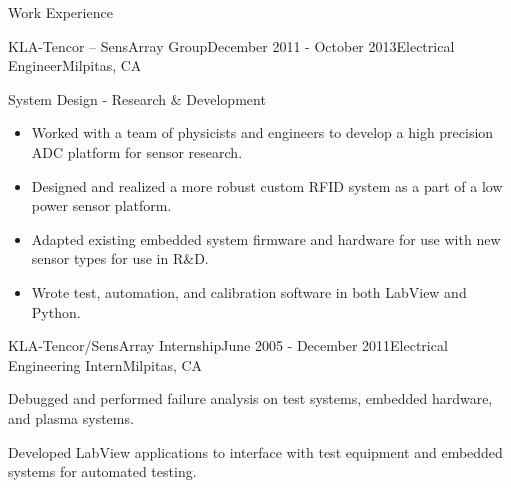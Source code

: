 \documentclass{resume} %
\begin{document}
\begin{rSection}{Work Experience}
\begin{rSubsection2}{KLA-Tencor -- SensArray Group}{December 2011 - October 2013}{Electrical Engineer}{Milpitas, CA}
\item System Design - Research \& Development 
\begin{itemize}
\itemsep -0.5em \vspace{-0.5em}
\renewcommand{\labelitemi}{-}
\item Worked with a team of physicists and engineers to develop a high precision ADC platform for sensor research. 
\item Designed and realized a more robust custom RFID system as a part of a low power sensor platform.
\item Adapted existing embedded system firmware and hardware for use with new sensor types for use in R\&D.
\item Wrote test, automation, and calibration software in both LabView and Python.
\end{itemize}

\end{rSubsection2}

\pagebreak[2]
\ssquish
\begin{rSubsection}{KLA-Tencor/SensArray Internship}{June 2005 - December 2011}{Electrical Engineering Intern}{Milpitas, CA}
\item Debugged and performed failure analysis on test systems, embedded hardware, and plasma systems.
\item Developed LabView applications to interface with test equipment and embedded systems for automated testing.
\end{rSubsection}
\end{rSection}
\end{document}
